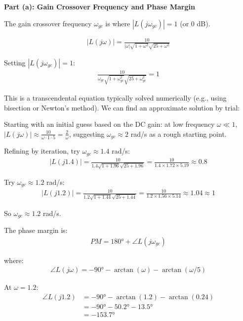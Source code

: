 \documentclass[11pt,a4paper]{article}
\begin{document}
\textbf{Part (a): Gain Crossover Frequency and Phase Margin}

The gain crossover frequency $\omega_{gc}$ is where $|L(j\omega_{gc})| = 1$ (or 0 dB).

\begin{align}
|L(j\omega)| = \frac{10}{|\omega|\sqrt{1+\omega^2}\sqrt{25+\omega^2}}
\end{align}

Setting $|L(j\omega_{gc})| = 1$:
\begin{align}
\frac{10}{\omega_{gc}\sqrt{1+\omega_{gc}^2}\sqrt{25+\omega_{gc}^2}} = 1
\end{align}

This is a transcendental equation typically solved numerically (e.g., using bisection or Newton's method). We can find an approximate solution by trial:

Starting with an initial guess based on the DC gain: at low frequency $\omega \ll 1$, $|L(j\omega)| \approx \frac{10}{\omega \cdot 1 \cdot 5} = \frac{2}{\omega}$, suggesting $\omega_{gc} \approx 2$ rad/s as a rough starting point.

Refining by iteration, try $\omega_{gc} \approx 1.4$ rad/s:
\begin{align}
|L(j1.4)| = \frac{10}{1.4\sqrt{1+1.96}\sqrt{25+1.96}} = \frac{10}{1.4 \times 1.72 \times 5.19} \approx 0.8
\end{align}

Try $\omega_{gc} \approx 1.2$ rad/s:
\begin{align}
|L(j1.2)| = \frac{10}{1.2\sqrt{1+1.44}\sqrt{25+1.44}} = \frac{10}{1.2 \times 1.56 \times 5.14} \approx 1.04 \approx 1
\end{align}

So $\omega_{gc} \approx 1.2$ rad/s.

The phase margin is:
\begin{align}
PM = 180° + \angle L(j\omega_{gc})
\end{align}

where:
\begin{align}
\angle L(j\omega) = -90° - \arctan(\omega) - \arctan(\omega/5)
\end{align}

At $\omega = 1.2$:
\begin{align}
\angle L(j1.2) &= -90° - \arctan(1.2) - \arctan(0.24) \\
&= -90° - 50.2° - 13.5° \\
&= -153.7°
\end{align}
\end{document}
